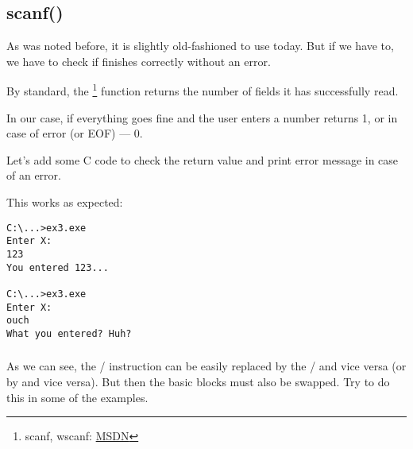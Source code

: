 \subsection{scanf()}

As was noted before, it is slightly old-fashioned to use \scanf today. 
But if we have to, we have to check if \scanf finishes correctly without an error.



By standard, the \scanf\footnote{scanf, wscanf: \href{http://msdn.microsoft.com/en-us/library/9y6s16x1(VS.71).aspx}{MSDN}} function returns the number of fields it has successfully read.

In our case, if everything goes fine and the user enters a number \scanf returns 1, or in case of error (or \ac{EOF}) --- 0.

Let's add some C code to check the \scanf return value and print error message in case of an error.

This works as expected:

\begin{lstlisting}
C:\...>ex3.exe
Enter X:
123
You entered 123...

C:\...>ex3.exe
Enter X:
ouch
What you entered? Huh?
\end{lstlisting}






\subsubsection{\Exercise}

As we can see, the / instruction can be easily replaced by the / and vice versa 
(or  by  and vice versa).
But then the basic blocks must also be swapped.
Try to do this in some of the examples.


